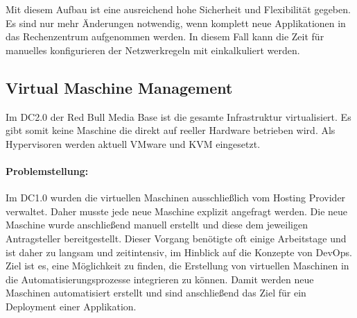 Mit diesem Aufbau ist eine ausreichend hohe Sicherheit und Flexibilität gegeben. Es sind nur mehr Änderungen notwendig, wenn komplett neue Applikationen in das Rechenzentrum aufgenommen werden. In diesem Fall kann die Zeit für manuelles konfigurieren der Netzwerkregeln mit einkalkuliert werden.

\subsection{Virtual Maschine Management}
\label{sec:vmmanagement}
Im DC2.0 der Red Bull Media Base ist die gesamte Infrastruktur virtualisiert. Es gibt somit keine Maschine die direkt auf reeller Hardware betrieben wird. Als Hypervisoren werden aktuell VMware und KVM eingesetzt.

\paragraph{Problemstellung:} Im DC1.0 wurden die virtuellen Maschinen ausschließlich vom Hosting Provider verwaltet. Daher musste jede neue Maschine explizit angefragt werden. Die neue Maschine wurde anschließend manuell erstellt und diese dem jeweiligen Antragsteller bereitgestellt. Dieser Vorgang benötigte oft einige Arbeitstage und ist daher zu langsam und zeitintensiv, im Hinblick auf die Konzepte von DevOps. Ziel ist es, eine Möglichkeit zu finden, die Erstellung von virtuellen Maschinen in die Automatisierungsprozesse integrieren zu können. Damit werden neue Maschinen automatisiert erstellt und sind anschließend das Ziel für ein Deployment einer Applikation.


